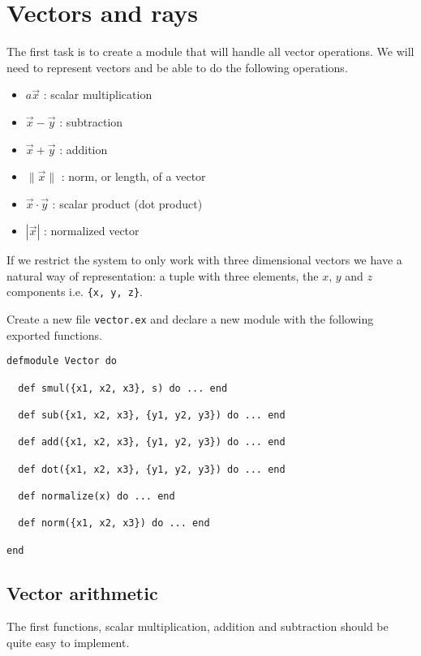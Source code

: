 \documentclass[a4paper,11pt]{article}
\begin{document}

\section{Vectors and rays}

The first task is to create a module that will handle all vector
operations. We will need to represent vectors and be able to do the
following operations.

\begin{itemize}
 \item $a\vec{x}$ : scalar multiplication
 \item $\vec{x} - \vec{y}$ : subtraction
 \item $\vec{x} + \vec{y}$ : addition
 \item $\|\vec{x}\|$ : norm, or length, of a vector
 \item $\vec{x} \cdot \vec{y}$ : scalar product (dot product)
 \item $|\vec{x}|$ : normalized vector
\end{itemize}

If we restrict the system to only work with three dimensional vectors
we have a natural way of representation: a tuple with three elements,
the $x$, $y$ and $z$ components i.e. {\tt \{x, y, z\}}. 

Create a new file {\tt vector.ex} and declare a new module with the
following exported functions.

\begin{verbatim}
defmodule Vector do

  def smul({x1, x2, x3}, s) do ... end

  def sub({x1, x2, x3}, {y1, y2, y3}) do ... end

  def add({x1, x2, x3}, {y1, y2, y3}) do ... end

  def dot({x1, x2, x3}, {y1, y2, y3}) do ... end  

  def normalize(x) do ... end

  def norm({x1, x2, x3}) do ... end

end
\end{verbatim}

\subsection*{Vector arithmetic}

The first functions, scalar multiplication, addition and subtraction
should be quite easy to implement.
\end{document}
